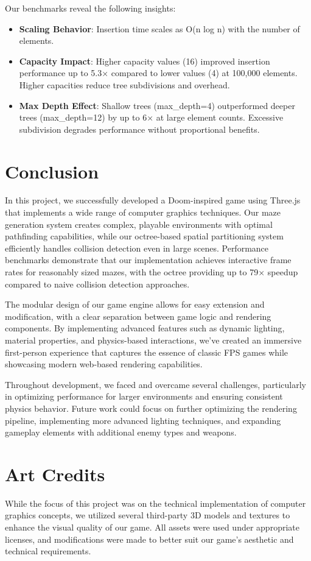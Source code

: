 \documentclass{article}
\begin{document}
Our benchmarks reveal the following insights:

\begin{itemize}
    \item \textbf{Scaling Behavior}: Insertion time scales as O(n
	    log n) with the number of elements.
    \item \textbf{Capacity Impact}: Higher capacity values (16) improved
	    insertion performance up to 5.3× compared to lower values (4) at
		100,000 elements. Higher capacities reduce tree subdivisions
		and overhead.
    \item \textbf{Max Depth Effect}: Shallow trees (max\_depth=4) outperformed
	    deeper trees (max\_depth=12) by up to 6× at large element counts.
		Excessive subdivision degrades performance without proportional
		benefits.
\end{itemize}


\section{Conclusion}
In this project, we successfully developed a Doom-inspired game using Three.js
that implements a wide range of computer graphics techniques. Our maze
generation system creates complex, playable environments with optimal
pathfinding capabilities, while our octree-based spatial partitioning system
efficiently handles collision detection even in large scenes. Performance
benchmarks demonstrate that our implementation achieves interactive frame rates
for reasonably sized mazes, with the octree providing up to 79× speedup
compared to naive collision detection approaches.

The modular design of our game engine allows for easy extension and
modification, with a clear separation between game logic and rendering
components. By implementing advanced features such as dynamic lighting,
material properties, and physics-based interactions, we've created an immersive
first-person experience that captures the essence of classic FPS games while
showcasing modern web-based rendering capabilities.

Throughout development, we faced and overcame several challenges, particularly
in optimizing performance for larger environments and ensuring consistent
physics behavior. Future work could focus on further optimizing the rendering
pipeline, implementing more advanced lighting techniques, and expanding
gameplay elements with additional enemy types and weapons.


\pagebreak
\section{Art Credits}
While the focus of this project was on the technical implementation of computer graphics concepts, we utilized several third-party 3D models and textures to enhance the visual quality of our game. All assets were used under appropriate licenses, and modifications were made to better suit our game's aesthetic and technical requirements.
\end{document}
